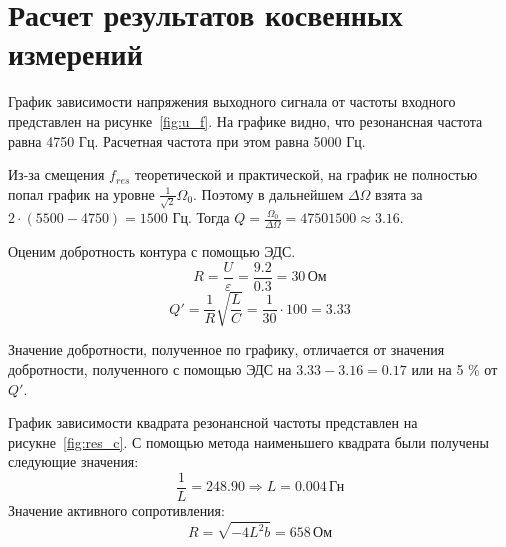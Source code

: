 \section{Расчет результатов косвенных измерений}
График зависимости напряжения выходного сигнала от частоты входного
представлен на рисунке~\ref{fig:u_f}.
На графике видно, что резонансная частота равна 4750 Гц.
Расчетная частота при этом равна 5000 Гц.

Из-за смещения $f_{res}$ теоретической и практической, на график не полностью
попал график на уровне $\frac{1}{\sqrt{2}} \Omega_0$.
Поэтому в дальнейшем $\Delta \Omega$ взята за $2 \cdot (5500 - 4750) = 1500$ Гц.
Тогда $Q = \frac{\Omega_0}{\Delta \Omega} = {4750}{1500} \approx 3.16$.

Оценим добротность контура с помощью ЭДС.
\[
  R = \frac{U}{\varepsilon} = \frac{9.2}{0.3} = 30 \, \text{Ом}
\]
\[
Q' = \frac{1}{R} \sqrt{\frac{L}{C}} = \frac{1}{30} \cdot 100 = 3.33
\]

Значение добротности, полученное по графику, отличается от значения добротности,
полученного с помощью ЭДС на \(3.33 - 3.16 = 0.17\) или на 5 \% от \(Q'\).

График зависимости квадрата резонансной частоты представлен на рисукне~\ref{fig:res_c}.
С помощью метода наименьшего квадрата были получены следующие значения:
\[
  \frac{1}{L} = 248.90 \Rightarrow L = 0.004 \, \text{Гн}
\]
Значение активного сопротивления:
\[
  R = \sqrt{- 4 L^2 b} = 658 \, \text{Ом}
\]
